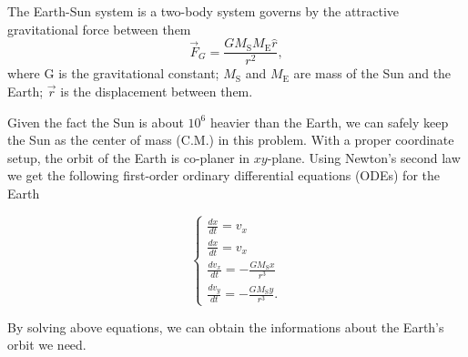 The Earth-Sun system is a two-body system governs by the attractive gravitational force between them
\begin{equation}
	\vec{F}_G = \frac{GM_{\mathrm{S}}M_{\mathrm{E}}\hat{r}}{r^2},
\end{equation}
where G is the gravitational constant; 
$M_{\mathrm{S}}$ and $M_{\mathrm{E}}$ are mass of the Sun and the Earth; $\vec{r}$ is the displacement between them.

Given the fact the Sun is about $10^6$ heavier than the Earth, we can safely keep the Sun as the center of mass (C.M.) in this problem. 
With a proper coordinate setup, the orbit of the Earth is co-planer in $xy$-plane. 
Using Newton's second law we get the following first-order ordinary differential equations (ODEs) for the Earth

\begin{equation}
	\label{earthsunodes}
	\left\{  
             \begin{array}{lr}  
             	\frac{dx}{dt} = v_x \\
				\frac{dx}{dt} = v_x \\
            	\frac{dv_x}{dt} = -\frac{GM_{\mathrm{S}}x}{r^3} \\
				\frac{dv_y}{dt} = -\frac{GM_{\mathrm{S}}y}{r^3}.
			\end{array}  
	\right.	
\end{equation}

By solving above equations, we can obtain the informations about the Earth's orbit we need.
